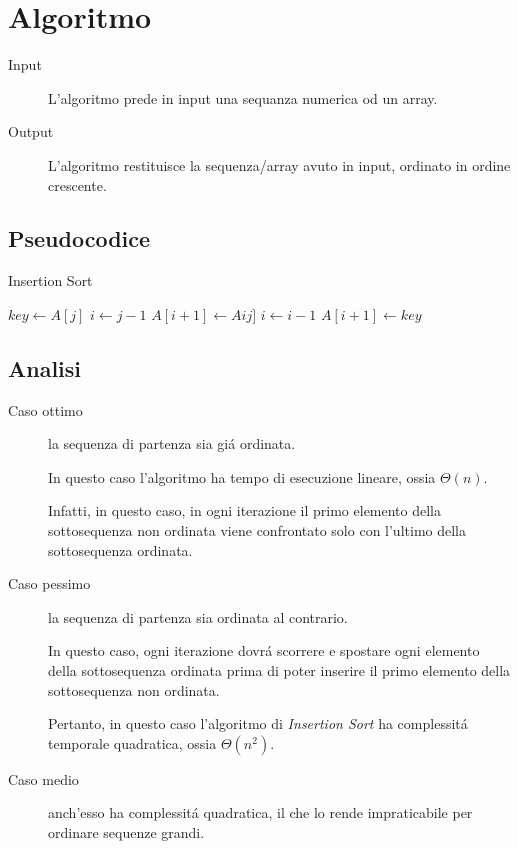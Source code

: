 \documentclass[a4paper, 9pt]{article}
\begin{document}
    
    
    
    \newpage
    
    \section{Algoritmo}
    \begin{description}
        \item[Input] L'algoritmo prede in input una sequanza numerica od un array.
        \item[Output] L'algoritmo restituisce la sequenza/array avuto in input, ordinato in ordine crescente.
    \end{description}
    
    \subsection{Pseudocodice}
    \begin{algorithm}
      \caption{Insertion Sort}
      \begin{algorithmic}
        
        \STATE $key \leftarrow A[j]$
        \STATE $i \leftarrow j-1$
        \STATE $A[i+1] \leftarrow Aij]$
        \STATE $i \leftarrow i-1$
        \ENDWHILE
        \STATE $A[i+1] \leftarrow key$
        \ENDFOR
    
      \end{algorithmic}
    \end{algorithm}
    
    \subsection{Analisi}
    \begin{description}
        \item[Caso ottimo] la sequenza di partenza sia gi\'a ordinata. 
        
        
        In questo caso l'algoritmo ha tempo di esecuzione lineare, ossia $\Theta (n)$. 
        
        Infatti, in questo caso, in ogni iterazione il primo elemento della sottosequenza non ordinata viene confrontato solo con l'ultimo della sottosequenza ordinata.
        
        \item[Caso pessimo] la sequenza di partenza sia ordinata al contrario. 
        
        In questo caso, ogni iterazione dovr\'a scorrere e spostare ogni elemento della sottosequenza ordinata prima di poter inserire il primo elemento della sottosequenza non ordinata. 
        
        Pertanto, in questo caso l'algoritmo di \textit{Insertion Sort} ha complessit\'a temporale quadratica, ossia $\Theta (n^{2})$.
        
        \item[Caso medio] anch'esso ha complessit\'a quadratica, il che lo rende impraticabile per ordinare sequenze grandi.
    \end{description}
    
\end{document}
